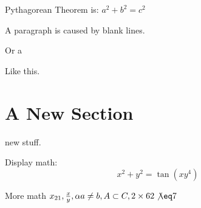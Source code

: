 \documentclass[12pt]{article}
\begin{document}
Pythagorean Theorem is: \(a^2 + b^2 = c^2\)

A paragraph is caused by blank lines.

Or a \par Like this.
\section{A New Section}

new stuff.

Display math: \[x^2+y^2=\tan(xy^4)\]


More math \(x_{21}, \frac{x}{y}, \alpha a \neq b, A \subset C, 2\times 6 2\not\eq 7\)
\end{document}
